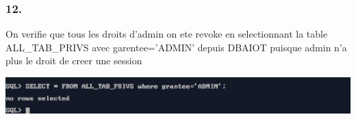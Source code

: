 \subsubsection*{12.}
On verifie que tous les droits d'admin on ete revoke en selectionnant la table ALL\_TAB\_PRIVS avec garentee='ADMIN' depuis DBAIOT puisque admin n'a plus le droit de creer une session 



\begin{center}
    \includegraphics[width=\textwidth]{ScreenShot/Partie4/verify2.png}
\end{center}

